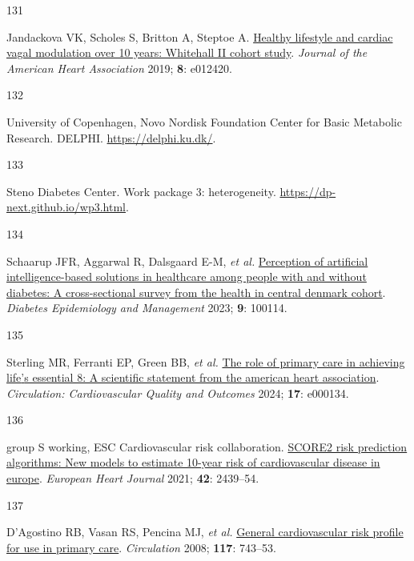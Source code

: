 \documentclass[
  letterpaper,
  headsepline=true,
  open=any]{scrbook}
\newlength{\cslhangindent}
\newlength{\csllabelwidth}
\newlength{\cslentryspacingunit} %
\newenvironment{CSLReferences}[2] %
 {%
  \setlength{\parindent}{0pt}
  \ifodd #1
  \let\oldpar\par
  \def\par{\hangindent=\cslhangindent\oldpar}
  \fi
  \setlength{\parskip}{#2\cslentryspacingunit}
 }%
 {}
\newcommand{\CSLLeftMargin}[1]{\parbox[t]{\csllabelwidth}{#1}}
\newcommand{\CSLRightInline}[1]{\parbox[t]{\linewidth - \csllabelwidth}{#1}\break}
\begin{document}
\begin{CSLReferences}{0}{0}
\leavevmode{}%
\CSLLeftMargin{131 }%
\CSLRightInline{Jandackova VK, Scholes S, Britton A, Steptoe A.
\href{https://doi.org/10.1161/JAHA.119.012420}{Healthy lifestyle and
cardiac vagal modulation over 10 years: Whitehall II cohort study}.
\emph{Journal of the American Heart Association} 2019; \textbf{8}:
e012420.}

\leavevmode{}%
\CSLLeftMargin{132 }%
\CSLRightInline{University of Copenhagen, Novo Nordisk Foundation Center
for Basic Metabolic Research. DELPHI. \url{https://delphi.ku.dk/}.}

\leavevmode{}%
\CSLLeftMargin{133 }%
\CSLRightInline{Steno Diabetes Center. Work package 3: heterogeneity.
\url{https://dp-next.github.io/wp3.html}.}

\leavevmode{}%
\CSLLeftMargin{134 }%
\CSLRightInline{Schaarup JFR, Aggarwal R, Dalsgaard E-M, \emph{et al.}
\href{https://doi.org/10.1016/j.deman.2022.100114}{Perception of
artificial intelligence-based solutions in healthcare among people with
and without diabetes: A cross-sectional survey from the health in
central denmark cohort}. \emph{Diabetes Epidemiology and Management}
2023; \textbf{9}: 100114.}

\leavevmode{}%
\CSLLeftMargin{135 }%
\CSLRightInline{Sterling MR, Ferranti EP, Green BB, \emph{et al.}
\href{https://doi.org/10.1161/HCQ.0000000000000134}{The role of primary
care in achieving life{'}s essential 8: A scientific statement from the
american heart association}. \emph{Circulation: Cardiovascular Quality
and Outcomes} 2024; \textbf{17}: e000134.}

\leavevmode{}%
\CSLLeftMargin{136 }%
\CSLRightInline{group S working, ESC Cardiovascular risk collaboration.
\href{https://doi.org/10.1093/eurheartj/ehab309}{SCORE2 risk prediction
algorithms: New models to estimate 10-year risk of cardiovascular
disease in europe}. \emph{European Heart Journal} 2021; \textbf{42}:
2439--54.}

\leavevmode{}%
\CSLLeftMargin{137 }%
\CSLRightInline{D'Agostino RB, Vasan RS, Pencina MJ, \emph{et al.}
\href{https://doi.org/10.1161/CIRCULATIONAHA.107.699579}{General
cardiovascular risk profile for use in primary care}. \emph{Circulation}
2008; \textbf{117}: 743--53.}


\end{CSLReferences}
\end{document}
